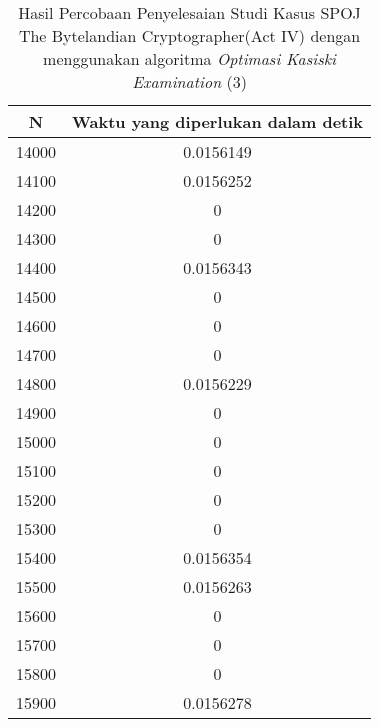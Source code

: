 \begin{table}[H]
\centering
\begin{tabular}{|c|c|}\hline
N&Waktu yang diperlukan dalam detik\\ \hline
14000&0.0156149\\ \hline
14100&0.0156252\\ \hline
14200&0\\ \hline
14300&0\\ \hline
14400&0.0156343\\ \hline
14500&0\\ \hline
14600&0\\ \hline
14700&0\\ \hline
14800&0.0156229\\ \hline
14900&0\\ \hline
15000&0\\ \hline
15100&0\\ \hline
15200&0\\ \hline
15300&0\\ \hline
15400&0.0156354\\ \hline
15500&0.0156263\\ \hline
15600&0\\ \hline
15700&0\\ \hline
15800&0\\ \hline
15900&0.0156278\\ \hline
\end{tabular}
\caption {Hasil Percobaan Penyelesaian Studi Kasus SPOJ The Bytelandian Cryptographer(Act IV) dengan menggunakan algoritma \textit{Optimasi Kasiski Examination} (3)}
\label{tab:res6}
\end{table}
